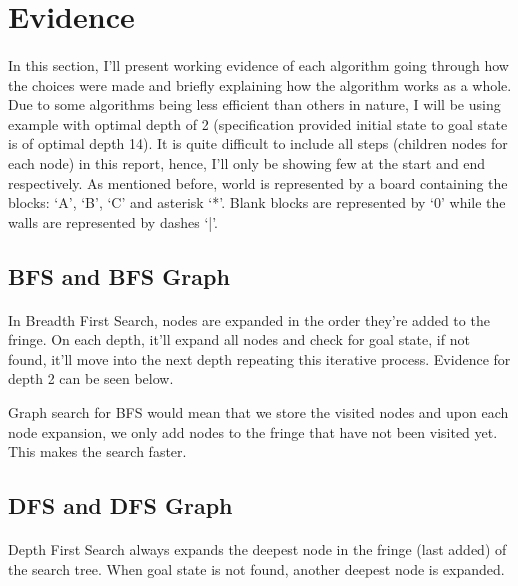 \documentclass[10pt]{article}
\begin{document}
  \section{Evidence}
  \paragraph{} \indent
  In this section, I’ll present working evidence of each algorithm going through how the choices were made and briefly explaining how the algorithm works as a whole. Due to some algorithms being less efficient than others in nature, I will be using example with optimal depth of 2 (specification provided initial state to goal state is of optimal depth 14).  It is quite difficult to include all steps (children nodes for each node) in this report, hence, I’ll only be showing few at the start and end respectively. As mentioned before, world is represented by a board containing the blocks: `A', `B', `C' and asterisk `*'. Blank blocks are represented by `0' while the walls are represented by dashes `|'.

  \subsection{BFS and BFS Graph}
  \paragraph{} \indent
  In Breadth First Search, nodes are expanded in the order they’re added to the fringe. On each depth, it’ll expand all nodes and check for goal state, if not found, it’ll move into the next depth repeating this iterative process. Evidence for depth 2 can be seen below. 

  Graph search for BFS would mean that we store the visited nodes and upon each node expansion, we only add nodes to the fringe that have not been visited yet. This makes the search faster.

  \subsection{DFS and DFS Graph}
  \paragraph{} \indent
  Depth First Search always expands the deepest node in the fringe (last added) of the search tree. When goal state is not found, another deepest node is expanded. 
\end{document}
